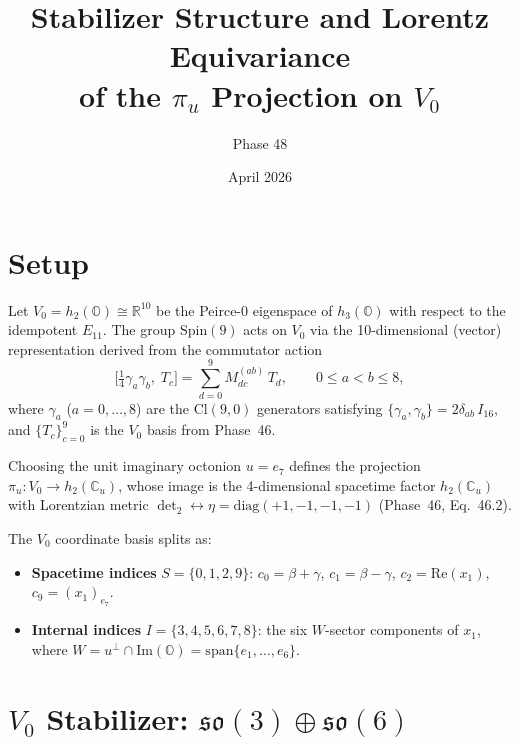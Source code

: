 \documentclass[11pt]{article}
\title{Stabilizer Structure and Lorentz Equivariance\\ of the $\pi_u$ Projection on $V_0$}
\author{Phase 48}
\date{April 2026}
\theoremstyle{definition}
\theoremstyle{remark}
\begin{document}
\maketitle

\section{Setup}

Let $V_0 = h_2(\mathbb{O}) \cong \mathbb{R}^{10}$ be the Peirce-0 eigenspace
of $h_3(\mathbb{O})$ with respect to the idempotent $E_{11}$.  The group
$\mathrm{Spin}(9)$ acts on $V_0$ via the 10-dimensional (vector)
representation derived from the commutator action
\begin{equation}\label{eq:comm-action}
  \bigl[\tfrac{1}{4}\gamma_a\gamma_b,\; T_c\bigr]
  = \sum_{d=0}^{9} M^{(ab)}_{dc}\, T_d,
  \qquad 0 \le a < b \le 8,
\end{equation}
where $\gamma_a$ ($a=0,\ldots,8$) are the $\mathrm{Cl}(9,0)$ generators
satisfying $\{\gamma_a,\gamma_b\} = 2\delta_{ab}\,I_{16}$,
and $\{T_c\}_{c=0}^{9}$ is the $V_0$ basis from Phase~46.

Choosing the unit imaginary octonion $u = e_7$ defines the projection
$\pi_u : V_0 \to h_2(\mathbb{C}_u)$, whose image is the 4-dimensional
spacetime factor $h_2(\mathbb{C}_u)$ with Lorentzian metric
$\det_2 \leftrightarrow \eta = \mathrm{diag}(+1,-1,-1,-1)$
(Phase~46, Eq.~46.2).

The $V_0$ coordinate basis splits as:
\begin{itemize}
  \item \textbf{Spacetime indices} $S = \{0,1,2,9\}$:
    $c_0 = \beta+\gamma$,\; $c_1 = \beta-\gamma$,\;
    $c_2 = \mathrm{Re}(x_1)$,\; $c_9 = (x_1)_{e_7}$.
  \item \textbf{Internal indices} $I = \{3,4,5,6,7,8\}$:
    the six $W$-sector components of $x_1$, where
    $W = u^\perp \cap \mathrm{Im}(\mathbb{O}) = \mathrm{span}\{e_1,\ldots,e_6\}$.
\end{itemize}

\section{$V_0$ Stabilizer: $\mathfrak{so}(3) \oplus \mathfrak{so}(6)$}
\end{document}
